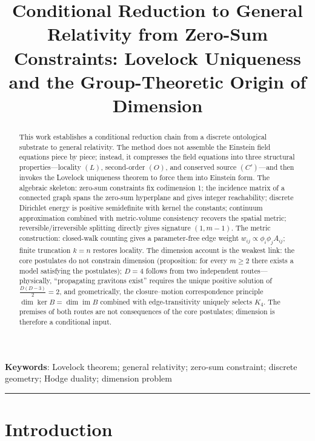 \documentclass[
  11pt,
]{article}
\author{}
\date{}
\title{Conditional Reduction to General Relativity from Zero-Sum Constraints: Lovelock Uniqueness and the Group-Theoretic Origin of Dimension}
\begin{document}
\maketitle

\begin{abstract}

This work establishes a conditional reduction chain from a discrete
ontological substrate to general relativity. The method does not
assemble the Einstein field equations piece by piece; instead, it
compresses the field equations into three structural
properties---locality \((L)\), second-order \((O)\), and conserved
source \((C')\)---and then invokes the Lovelock uniqueness theorem to
force them into Einstein form. The algebraic skeleton: zero-sum
constraints fix codimension 1; the incidence matrix of a connected graph
spans the zero-sum hyperplane and gives integer reachability; discrete
Dirichlet energy is positive semidefinite with kernel the constants;
continuum approximation combined with metric-volume consistency recovers
the spatial metric; reversible/irreversible splitting directly gives
signature \((1,m-1)\). The metric construction: closed-walk counting
gives a parameter-free edge weight \(w_{ij}\propto\phi_i\phi_jA_{ij}\);
finite truncation \(k=n\) restores locality. The dimension account is
the weakest link: the core postulates do not constrain dimension
(proposition: for every \(m\ge2\) there exists a model satisfying the
postulates); \(D=4\) follows from two independent routes---physically,
``propagating gravitons exist'' requires the unique positive solution of
\(\frac{D(D-3)}2=2\), and geometrically, the closure--motion
correspondence principle \(\dim\ker B=\dim\operatorname{im}B\) combined
with edge-transitivity uniquely selects \(K_4\). The premises of both
routes are not consequences of the core postulates; dimension is
therefore a conditional input.

\end{abstract}

\noindent\textbf{Keywords}: Lovelock theorem; general relativity; zero-sum
constraint; discrete geometry; Hodge duality; dimension problem

\begin{center}\rule{0.5\linewidth}{0.5pt}\end{center}

\section{Introduction}\label{introduction}
\end{document}
